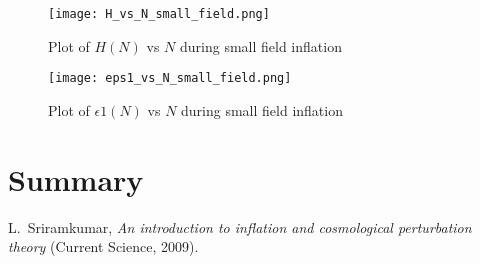 \documentclass[12pt,a4paper,oneside]{book}
\begin{document}
\begin{figure}
\begin{center}
\texttt{[image: H\_vs\_N\_small\_field.png]}
\caption[Plot of $H(N)$ vs $N$ during small field inflation]{Plot of $H(N)$ vs $N$ during small field inflation}
\label{blah}
\end{center}
\end{figure}

\begin{figure}
\begin{center}
\texttt{[image: eps1\_vs\_N\_small\_field.png]}
\caption[Plot of $\epsilon 1(N)$ vs $N$ during small field inflation]{Plot of $\epsilon 1(N)$ vs $N$ during small field inflation}
\label{blah}
\end{center}
\end{figure}


\chapter{Summary}


\begin{thebibliography}{99}
L.~Sriramkumar, {\sl An introduction to inflation and cosmological perturbation theory}\/ (Current Science, 2009).
\end{thebibliography}

\end{document}
